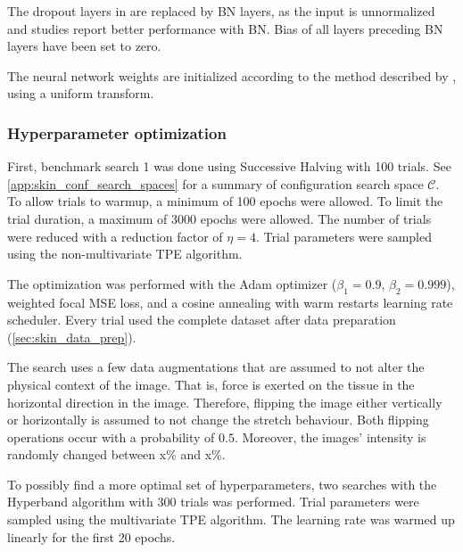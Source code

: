 The dropout layers in \cite{Soylu2022} are replaced by BN layers, as the input is unnormalized and studies report better performance with BN.
Bias of all layers preceding BN layers have been set to zero.

The neural network weights are initialized according to the method described by \textcite{He2015a}, using a uniform transform.

\subsubsection{Hyperparameter optimization}
First, benchmark search 1 was done using Successive Halving with 100 trials.
See \cref{app:skin_conf_search_spaces} for a summary of configuration search space $\mathcal{C}$.
To allow trials to warmup, a minimum of 100 epochs were allowed.
To limit the trial duration, a maximum of 3000 epochs were allowed.
The number of trials were reduced with a reduction factor of $\eta=4$.
Trial parameters were sampled using the non-multivariate TPE algorithm.

The optimization was performed with the Adam optimizer ($\beta_1=0.9$, $\beta_2=0.999$), weighted focal MSE loss, and a cosine annealing with warm restarts learning rate scheduler.
Every trial used the complete dataset after data preparation (\cref{sec:skin_data_prep}).

The search uses a few data augmentations that are assumed to not alter the physical context of the image.
That is, force is exerted on the tissue in the horizontal direction in the image.
Therefore, flipping the image either vertically or horizontally is assumed to not change the stretch behaviour.
Both flipping operations occur with a probability of $0.5$.
Moreover, the images' intensity is randomly changed between x\% and x\%.

To possibly find a more optimal set of hyperparameters, two searches with the Hyperband algorithm with 300 trials was performed.
Trial parameters were sampled using the multivariate TPE algorithm.
The learning rate was warmed up linearly for the first 20 epochs.


